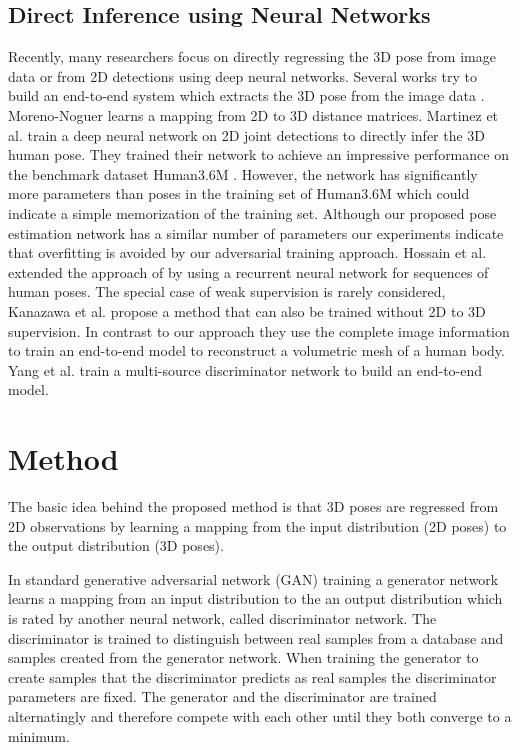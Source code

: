 \documentclass[10pt,twocolumn,letterpaper]{article}
\begin{document}
\subsection{Direct Inference using Neural Networks}
Recently, many researchers focus on directly regressing the 3D pose from image data or from 2D detections using deep neural networks.
Several works try to build an end-to-end system which extracts the 3D pose from the image data \cite{Park2016,Du2016,mpii3dhp2017,VNect_SIGGRAPH2017,Pavlakos2017,lcrnet2017,OriNet2018,Kanazawa2018,NBF2018,pavlakos2018,Tung2017,Yang2018}.
Moreno-Noguer \cite{Moreno_cvpr2017} learns a mapping from 2D to 3D distance matrices.
Martinez et al. \cite{martinez_2017_3dbaseline} train a deep neural network on 2D joint detections to directly infer the 3D human pose.
They trained their network to achieve an impressive performance on the benchmark dataset Human3.6M \cite{h36m_pami}.
However, the network has significantly more parameters than poses in the training set of Human3.6M which could indicate a simple memorization of the training set.
Although our proposed pose estimation network has a similar number of parameters our experiments indicate that overfitting is avoided by our adversarial training approach.
Hossain et al. \cite{Hossain2018} extended the approach of \cite{martinez_2017_3dbaseline} by using a recurrent neural network for sequences of human poses.
The special case of weak supervision is rarely considered, 
Kanazawa et al. \cite{Kanazawa2018} propose a method that can also be trained without 2D to 3D supervision.
In contrast to our approach they use the complete image information to train an end-to-end model to reconstruct a volumetric mesh of a human body.
Yang et al. \cite{Yang2018} train a multi-source discriminator network to build an end-to-end model.

\section{Method}
The basic idea behind the proposed method is that 3D poses are regressed from 2D observations by learning a mapping from the input distribution (2D poses) to the output distribution (3D poses). 

In standard generative adversarial network (GAN) training \cite{Goodfellow2014} a generator network learns a mapping from an input distribution to the an output distribution which is rated by another neural network, called discriminator network.
The discriminator is trained to distinguish between real samples from a database and samples created from the generator network.
When training the generator to create samples that the discriminator predicts as real samples the discriminator parameters are fixed.
The generator and the discriminator are trained alternatingly and therefore compete with each other until they both converge to a minimum.
\end{document}
